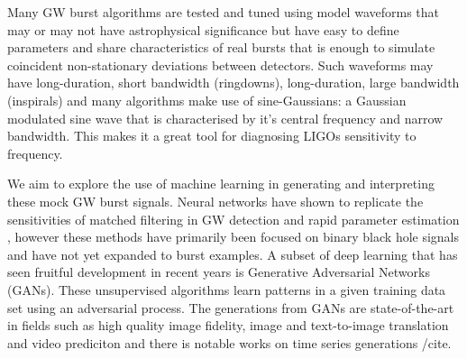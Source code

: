 \documentclass[%
 reprint,
 amsmath,amssymb,
 aps,
]{revtex4-2}
\begin{document}
Many GW burst algorithms \cite{cite the shit outta this} are tested and tuned using model waveforms that may or may not have astrophysical significance but have easy to define parameters and share characteristics of real bursts that is enough to simulate coincident non-stationary deviations between detectors. Such waveforms may have long-duration, short bandwidth (ringdowns), long-duration, large bandwidth (inspirals) and many algorithms make use of sine-Gaussians: a Gaussian modulated sine wave that is characterised by it's central frequency and narrow bandwidth. This makes it a great tool for diagnosing LIGOs sensitivity to frequency. 

We aim to explore the use of machine learning in generating and interpreting these mock GW burst signals. Neural networks have shown to replicate the sensitivities of matched filtering in GW detection \cite{} and rapid parameter estimation \cite{}, however these methods have primarily been focused on binary black hole signals and have not yet expanded to burst examples. A subset of deep learning that has seen fruitful development in recent years \cite{} is Generative Adversarial Networks (GANs). These unsupervised algorithms learn patterns in a given training data set using an adversarial process. The generations from GANs are state-of-the-art in fields such as high quality image fidelity, image and text-to-image translation and video prediciton \cite{} and there is notable works on time series generations /cite. 





\begin{comment}
The detections of gravitational waves by Advanced Laser Interferometer
Gravitational wave Observatory (aLIGO) and Advanced Virgo [1–5], have opened up
new avenues to explore the Universe. Astrophysical sources of transient
gravitational waves include the merging of compact binary star systems like
black holes and/or neutron stars [6], core-collapse supernova [7], pulsar
glitches [8] and other events involving accelerating massive objects.
Gravitational wave bursts (GWBs) are an exciting area of research as the
emissions process of such waves is not well understood. The waveforms often
depend on complicated orbital dynamics and equations of state which limit the
sensitivity on searching for burst sources. Typically, the duration of burst
signals are short with amplitudes that can be greater than the detector noise.
Burst searches look for excess power contained in a time-frequency plot and
rely on consistent arrival times, waveform shapes and frequencies between
detectors. We focus on utilising an unsupervised form of machine learning
called Generative Adversarial Networks [9] as a generalised GW transient
search. A two detector case is considered such that the signals retain their
form between detections and a defined time delay between detections relating to
the sky orientation of the source.
\end{comment}
\end{document}
